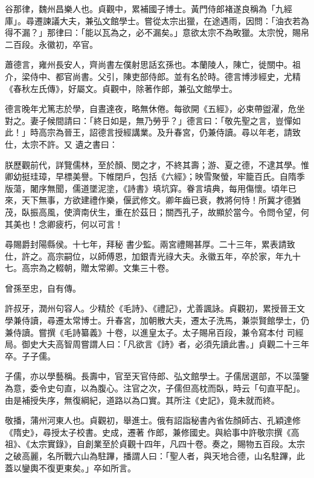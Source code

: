 \begin{pinyinscope}
 谷那律，魏州昌樂人也。貞觀中，累補國子博士。黃門侍郎褚遂良稱為「九經庫」。尋遷諫議大夫，兼弘文館學士。嘗從太宗出獵，在途遇雨，因問：「油衣若為得不漏？」那律曰：「能以瓦為之，必不漏矣。」意欲太宗不為畋獵。太宗悅，賜帛二百段。永徽初，卒官。



 蕭德言，雍州長安人，齊尚書左僕射思話玄孫也。本蘭陵人，陳亡，徙關中。祖介，梁侍中、都官尚書。父引，陳吏部侍郎。並有名於時。德言博涉經史，尤精《春秋左氏傳》，好屬文。貞觀中，除著作郎，兼弘文館學士。



 德言晚年尤篤志於學，自晝達夜，略無休倦。每欲開《五經》，必束帶盥濯，危坐對之。妻子候間請曰：「終日如是，無乃勞乎？」德言曰：「敬先聖之言，豈憚如此！」時高宗為晉王，詔德言授經講業。及升春宮，仍兼侍讀。尋以年老，請致仕，太宗不許。又
 遺之書曰：



 朕歷觀前代，詳覽儒林，至於顏、閔之才，不終其壽；游、夏之德，不逮其學。惟卿幼挺珪璋，早標美譽。下帷閉戶，包括《六經》；映雪聚螢，牢籠百氏。自隋季版蕩，闍序無聞，儒道墜泥塗，《詩書》填坑穽。眷言墳典，每用傷懷。頃年已來，天下無事，方欲建禮作樂，偃武修文。卿年齒已衰，教將何恃！所冀才德猶茂，臥振高風，使濟南伏生，重在於茲日；關西孔子，故顯於當今。令問令望，何其美也！念卿疲朽，何以可言！



 尋賜爵封陽縣侯。十七年，拜秘
 書少監。兩宮禮賜甚厚。二十三年，累表請致仕，許之。高宗嗣位，以師傅恩，加銀青光祿大夫。永徽五年，卒於家，年九十七。高宗為之輟朝，贈太常卿。文集三十卷。



 曾孫至忠，自有傳。



 許叔牙，潤州句容人。少精於《毛詩》、《禮記》，尤善諷詠。貞觀初，累授晉王文學兼侍讀，尋遷太常博士。升春宮，加朝散大夫，遷太子洗馬，兼崇賢館學士，仍兼侍讀。嘗撰《毛詩纂義》十卷，以進皇太子。太子賜帛百段，兼令寫本付
 司經局。御史大夫高智周嘗謂人曰：「凡欲言《詩》者，必須先讀此書。」貞觀二十三年卒。子子儒。



 子儒，亦以學藝稱。長壽中，官至天官侍郎、弘文館學士。子儒居選部，不以藻鑒為意，委令史句直，以為腹心。注官之次，子儒但高枕而臥，時云「句直平配」。由是補授失序，無復綱紀，道路以為口實。其所注《史記》，竟未就而終。



 敬播，蒲州河東人也。貞觀初，舉進士。俄有詔詣秘書內省佐顏師古、孔穎達修《隋史》，尋授太子校書。史成，遷著
 作郎，兼修國史。與給事中許敬宗撰《高祖》、《太宗實錄》，自創業至於貞觀十四年，凡四十卷。奏之，賜物五百段。太宗之破高麗，名所戰六山為駐蹕，播謂人曰：「聖人者，與天地合德，山名駐蹕，此蓋以鑾輿不復更東矣。」卒如所言。




\end{pinyinscope}
